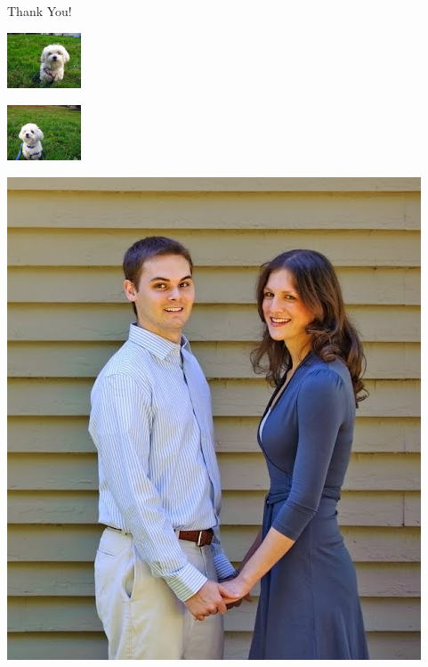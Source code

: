 \documentclass[12pt]{beamer}
\begin{document}
\begin{frame}{Thank You!}
\begin{minipage}[b]{0.45in}
\includegraphics[height=0.65in, trim=5in 0in 1.5in 0in, clip]{julia}

\includegraphics[height=0.65in, trim=0.5in 0in 6in 0in, clip]{nicholas}

\end{minipage}
\hfill
\includegraphics[height=\picheight]{matthew2}

\end{frame}
\end{document}
